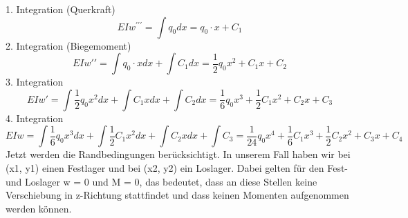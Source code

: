 1. Integration (Querkraft)
\begin{equation}
	EIw^{\prime\prime\prime}=
	\int q_0dx=
	q_0\cdot x+C_1
\end{equation}
2. Integration (Biegemoment)
\begin{equation}
	EIw\prime\prime=
	\int{q_0\cdot x}dx+\int C_1dx=
	\frac{1}{2}q_0x^2+C_1x+C_2
\end{equation}
3. Integration
\begin{equation}
	EIw\prime=
	\int{\frac{1}{2}q_0x^2}dx+\int{C_1x}dx+\int C_2dx=
	\frac{1}{6}q_0x^3+\frac{1}{2}C_1x^2+C_2x+C_3
\end{equation}
4. Integration
\begin{equation}
	EIw=
	\int{\frac{1}{6}q_0x^3}dx+\int{\frac{1}{2}C_1x^2}dx+\int{C_2x}dx+\int C_3=
	\frac{1}{24}q_0x^4+\frac{1}{6}C_1x^3+\frac{1}{2}C_2x^2+C_3x+C_4
\end{equation}
Jetzt werden die Randbedingungen berücksichtigt.
In unserem Fall haben wir bei (x1, y1) einen Festlager und bei (x2, y2) ein Loslager.
Dabei gelten für den Fest- und Loslager w = 0 und M = 0, das bedeutet, dass an diese Stellen keine Verschiebung in z-Richtung stattfindet und dass keinen Momenten aufgenommen werden können.

